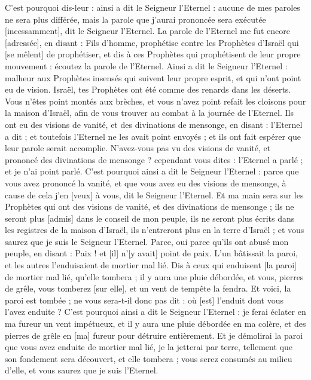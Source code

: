 \begin{multicols}{2}
C'est pourquoi dis-leur : ainsi a dit le Seigneur l'Eternel : aucune de mes paroles ne sera plus différée, mais la parole que j'aurai prononcée sera exécutée [incessamment], dit le Seigneur l'Eternel.
\VerseOne{}La parole de l'Eternel me fut encore [adressée], en disant :
Fils d'homme, prophétise contre les Prophètes d'Israël qui [se mêlent] de prophétiser, et dis à ces Prophètes qui prophétisent de leur propre mouvement : écoutez la parole de l'Eternel.
Ainsi a dit le Seigneur l'Eternel : malheur aux Prophètes insensés qui suivent leur propre esprit, et qui n'ont point eu de vision.
Israël, tes Prophètes ont été comme des renards dans les déserts.
Vous n'êtes point montés aux brèches, et vous n'avez point refait les cloisons pour la maison d'Israël, afin de vous trouver au combat à la journée de l'Eternel.
Ils ont eu des visions de vanité, et des divinations de mensonge, en disant : l'Eternel a dit ; et toutefois l'Eternel ne les avait point envoyés ; et ils ont fait espérer que leur parole serait accomplie.
N'avez-vous pas vu des visions de vanité, et prononcé des divinations de mensonge ? cependant vous dites : l'Eternel a parlé ; et je n'ai point parlé.
C'est pourquoi ainsi a dit le Seigneur l'Eternel : parce que vous avez prononcé la vanité, et que vous avez eu des visions de mensonge, à cause de cela j'en [veux] à vous, dit le Seigneur l'Eternel.
Et ma main sera sur les Prophètes qui ont des visions de vanité, et des divinations de mensonge ; ils ne seront plus [admis] dans le conseil de mon peuple, ils ne seront plus écrits dans les registres de la maison d'Israël, ils n'entreront plus en la terre d'Israël ; et vous saurez que je suis le Seigneur l'Eternel.
Parce, oui parce qu'ils ont abusé mon peuple, en disant : Paix ! et [il] n'[y avait] point de paix. L'un bâtissait la paroi, et les autres l'enduisaient de mortier mal lié.
Dis à ceux qui enduisent [la paroi] de mortier mal lié, qu'elle tombera ; il y aura une pluie débordée, et vous, pierres de grêle, vous tomberez [sur elle], et un vent de tempête la fendra.
Et voici, la paroi est tombée ; ne vous sera-t-il donc pas dit : où [est] l'enduit dont vous l'avez enduite ?
C'est pourquoi ainsi a dit le Seigneur l'Eternel : je ferai éclater en ma fureur un vent impétueux, et il y aura une pluie débordée en ma colère, et des pierres de grêle en [ma] fureur pour détruire entièrement.
Et je démolirai la paroi que vous avez enduite de mortier mal lié, je la jetterai par terre, tellement que son fondement sera découvert, et elle tombera ; vous serez consumés au milieu d'elle, et vous saurez que je suis l'Eternel.

\end{multicols}
